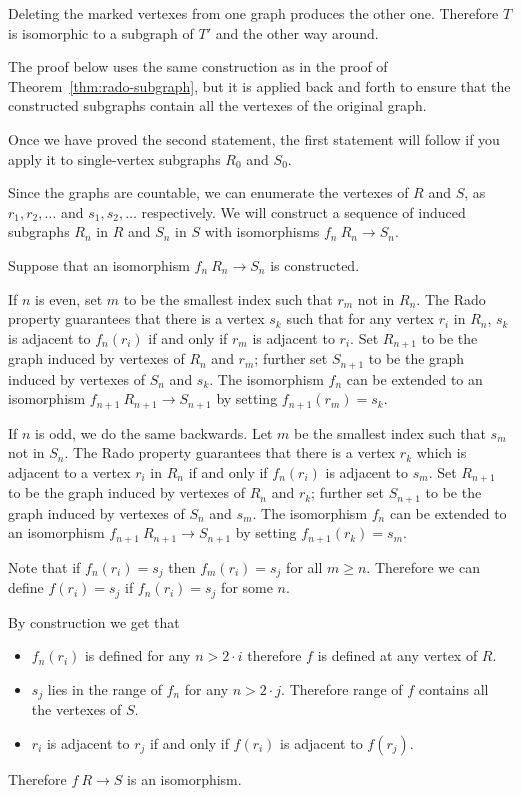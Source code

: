 Deleting the marked vertexes from one graph produces the other one. 
Therefore $T$ is isomorphic to a subgraph of $T'$ and the other way around.

The proof below uses the same construction as in the proof of Theorem~\ref{thm:rado-subgraph}, but it is applied back and forth to ensure that the constructed subgraphs contain all the vertexes of the original graph.


Once we have proved the second statement,
the first statement will follow if you apply it to single-vertex subgraphs $R_0$ and $S_0$.

Since the graphs are countable,
we can enumerate the vertexes of $R$ and $S$, as $r_1 , r_2 , \dots$ and $s_1, s_2,\dots$ respectively. 
We will construct a sequence of induced subgraphs $R_n$ in $R$ and $S_n$ in $S$ with isomorphisms $f_n\:R_n\to S_n$.

Suppose that an isomorphism $f_n\:R_n\to S_n$ is constructed. 

If $n$ is even, set $m$ to be the smallest index such that $r_m$ not in $R_n$.
The Rado property guarantees that there is a vertex $s_k$ such that for any vertex $r_i$ in $R_n$, $s_k$ is adjacent to $f_n(r_i)$ if and only if $r_m$ is adjacent to $r_i$.
Set $R_{n+1}$ to be the graph induced by vertexes of $R_n$ and $r_m$;
further set $S_{n+1}$ to be the graph induced by vertexes of $S_n$ and $s_k$.
The isomorphism $f_n$ can be extended to an isomorphism $f_{n+1}\:R_{n+1}\to S_{n+1}$ by
setting $f_{n+1}(r_m)=s_k$.  

If $n$ is odd, we do the same backwards.
Let $m$ be the smallest index such that $s_m$ not in $S_n$.
The Rado property guarantees that there is a vertex $r_k$ which is adjacent to a vertex $r_i$ in $R_n$ if and only if $f_n(r_i)$ is adjacent to $s_m$.
Set $R_{n+1}$ to be the graph induced by vertexes of $R_n$ and $r_k$;
further set $S_{n+1}$ to be the graph induced by vertexes of $S_n$ and $s_m$.
The isomorphism $f_n$ can be extended to an isomorphism $f_{n+1}\:R_{n+1}\to S_{n+1}$ by
setting $f_{n+1}(r_k)=s_m$.

Note that if $f_n(r_i)=s_j$ then $f_m(r_i)=s_j$ for all $m\ge n$.
Therefore we can define $f(r_i)=s_j$ if $f_n(r_i)=s_j$ for some $n$.


By construction we get that 
\begin{itemize}
\item $f_n(r_i)$ is defined for any $n>2\cdot i$ therefore $f$ is defined at any vertex of $R$.
\item $s_j$ lies in the range of $f_n$ for any $n>2\cdot j$.
Therefore range of $f$ contains all the vertexes of $S$.
\item $r_i$ is adjacent to $r_j$ if and only if $f(r_i)$ is adjacent to $f(r_j)$.
\end{itemize}
Therefore $f\:R\to S$ is an isomorphism.
\qeds

